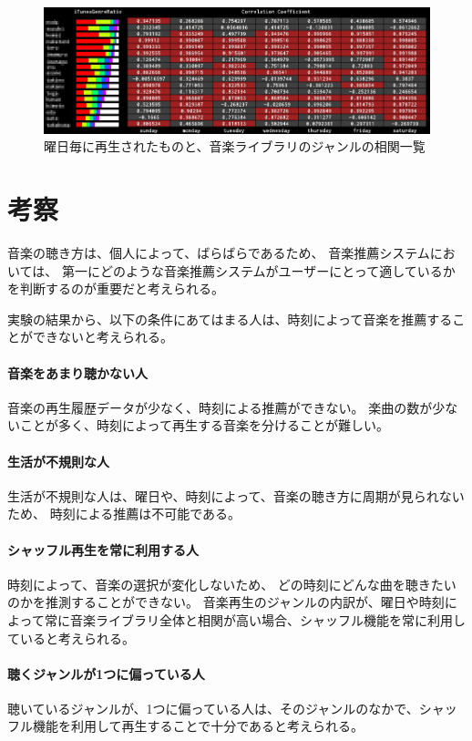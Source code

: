 \documentclass[11pt, onecolumn]{jsarticle}
\begin{document}
\begin{figure}
\begin{center}
\includegraphics[width = 14cm]{corTable.jpg}
\caption{曜日毎に再生されたものと、音楽ライブラリのジャンルの相関一覧}
\label{corTable}
\end{center}
\end{figure}


\section{考察}
音楽の聴き方は、個人によって、ばらばらであるため、
音楽推薦システムにおいては、
第一にどのような音楽推薦システムがユーザーにとって適しているかを判断するのが重要だと考えられる。

実験の結果から、以下の条件にあてはまる人は、時刻によって音楽を推薦することができないと考えられる。
\paragraph{音楽をあまり聴かない人}
音楽の再生履歴データが少なく、時刻による推薦ができない。
楽曲の数が少ないことが多く、時刻によって再生する音楽を分けることが難しい。

\paragraph{生活が不規則な人}
生活が不規則な人は、曜日や、時刻によって、音楽の聴き方に周期が見られないため、
時刻による推薦は不可能である。

\paragraph{シャッフル再生を常に利用する人}
時刻によって、音楽の選択が変化しないため、
どの時刻にどんな曲を聴きたいのかを推測することができない。
音楽再生のジャンルの内訳が、曜日や時刻によって常に音楽ライブラリ全体と相関が高い場合、シャッフル機能を常に利用していると考えられる。

\paragraph{聴くジャンルが1つに偏っている人}
聴いているジャンルが、1つに偏っている人は、そのジャンルのなかで、シャッフル機能を利用して再生することで十分であると考えられる。
\end{document}
